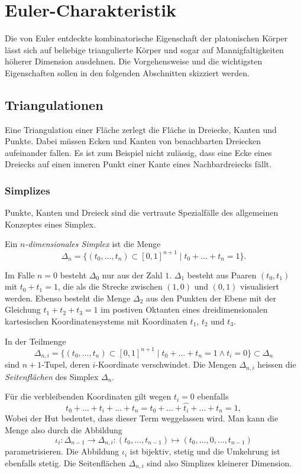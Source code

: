 %
%
\section{Euler-Charakteristik}
Die von Euler entdeckte kombinatorische Eigenschaft der platonischen
Körper lässt sich auf beliebige triangulierte Körper und sogar
auf Mannigfaltigkeiten höherer Dimension ausdehnen.
Die Vorgehensweise und die wichtigsten Eigenschaften sollen in den
folgenden Abschnitten skizziert werden.

%
%
\subsection{Triangulationen}
Eine Triangulation einer Fläche zerlegt die Fläche in Dreiecke,
Kanten und Punkte.
Dabei müssen Ecken und Kanten von benachbarten Dreiecken aufeinander
fallen.
Es ist zum Beispiel nicht zulässig, dass eine Ecke eines Dreiecks
auf einen inneren Punkt einer Kante eines Nachbardreiecks fällt.

%
%
\subsubsection{Simplizes}
Punkte, Kanten und Dreieck sind die vertraute Spezialfälle des allgemeinen
Konzeptes eines Simplex.

\begin{definition}[Simplex]
%
Ein \emph{$n$-dimensionales Simplex} ist die Menge
\[
\Delta_n
=
\{
(t_0,\dots,t_n)
\subset
[0,1]^{n+1}
\mid
t_0+\dots+t_n=1
\}.
\]
\end{definition}

Im Falle $n=0$ besteht $\Delta_0$ nur aus der Zahl $1$.
$\Delta_1$ besteht aus Paaren $(t_0,t_1)$ mit $t_0+t_1=1$, die
als die Strecke zwischen $(1,0)$ und $(0,1)$ visualisiert
werden.
Ebenso besteht die Menge $\Delta_2$ aus den Punkten der Ebene mit
der Gleichung $t_1+t_2+t_3=1$ im postiven Oktanten eines
dreidimensionalen kartesischen Koordinatensystems mit Koordinaten
$t_1$, $t_2$ und $t_3$.

In der Teilmenge
\[
\Delta_{n,i}
=
\{
(t_0,\dots,t_n)
\subset
[0,1]^{n+1}
\mid
t_0+\dots+t_n=1
\wedge
t_i=0
\}
\subset
\Delta_n
\]
sind $n+1$-Tupel, deren $i$-Koordinate verschwindet.
Die Mengen $\Delta_{n,i}$ heissen die \emph{Seitenflächen}
%
des Simplex $\Delta_n$.

Für die verbleibenden Koordinaten gilt wegen $t_i=0$ ebenfalls
\[
t_0+\dots+t_i+\dots+t_n
=
t_0+\dots+\widehat{t_i}+\dots+t_n
=
1,
\]
Wobei der Hut bedeutet, dass dieser Term weggelassen wird.
Man kann die Menge also durch die Abbildung
\[
\iota_i
\colon
\Delta_{n-1}
\to
\Delta_{n,i}
:
(t_0,\dots,t_{n-1})
\mapsto
(t_0,\dots,0,\dots,t_{n-1})
\]
parametrisieren.
Die Abbildung $\iota_i$ ist bijektiv, stetig und die Umkehrung ist
ebenfalls stetig.
Die Seitenflächen $\Delta_{n,i}$ sind also Simplizes kleinerer 
Dimension.


